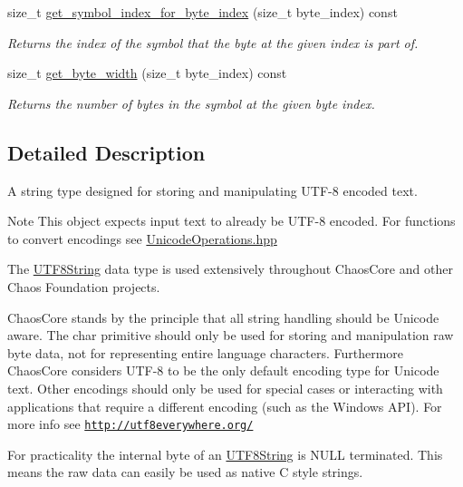 \begin{DoxyCompactItemize}
size\-\_\-t \hyperlink{classchaos_1_1uni_1_1_u_t_f8_string_a2a1f26752cfc6d5c9b14e491f2998051}{get\-\_\-symbol\-\_\-index\-\_\-for\-\_\-byte\-\_\-index} (size\-\_\-t byte\-\_\-index) const 
\begin{DoxyCompactList}\small\item\em Returns the index of the symbol that the byte at the given index is part of. \end{DoxyCompactList}\item 
size\-\_\-t \hyperlink{classchaos_1_1uni_1_1_u_t_f8_string_a7aa47a33f1886febf642c05ac51a433e}{get\-\_\-byte\-\_\-width} (size\-\_\-t byte\-\_\-index) const 
\begin{DoxyCompactList}\small\item\em Returns the number of bytes in the symbol at the given byte index. \end{DoxyCompactList}\end{DoxyCompactItemize}


\subsection{Detailed Description}
A string type designed for storing and manipulating U\-T\-F-\/8 encoded text. 

\begin{DoxyNote}{Note}
This object expects input text to already be U\-T\-F-\/8 encoded. For functions to convert encodings see \hyperlink{_unicode_operations_8hpp}{Unicode\-Operations.\-hpp}
\end{DoxyNote}
The \hyperlink{classchaos_1_1uni_1_1_u_t_f8_string}{U\-T\-F8\-String} data type is used extensively throughout Chaos\-Core and other Chaos Foundation projects.

Chaos\-Core stands by the principle that all string handling should be Unicode aware. The {\ttfamily char} primitive should only be used for storing and manipulation raw byte data, not for representing entire language characters. Furthermore Chaos\-Core considers U\-T\-F-\/8 to be the only default encoding type for Unicode text. Other encodings should only be used for special cases or interacting with applications that require a different encoding (such as the Windows A\-P\-I). For more info see \href{http://utf8everywhere.org/}{\tt http\-://utf8everywhere.\-org/}

For practicality the internal byte of an \hyperlink{classchaos_1_1uni_1_1_u_t_f8_string}{U\-T\-F8\-String} is N\-U\-L\-L terminated. This means the raw data can easily be used as native C style strings.

